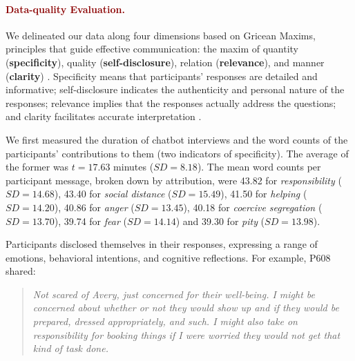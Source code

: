 
\paragraph{\textcolor{darkred}{\textbf{Data-quality Evaluation.}}}
We delineated our data along four dimensions based on Gricean Maxims, principles that guide effective communication: the maxim of quantity (\textbf{specificity}), quality (\textbf{self-disclosure}), relation (\textbf{relevance}), and manner (\textbf{clarity}) \cite{metric_grice_1975, chatbot_xiao_2020}. 
Specificity means that participants' responses are detailed and informative; self-disclosure indicates the authenticity and personal nature of the responses; relevance implies that the responses actually address the questions; and clarity facilitates accurate interpretation \cite{metric_grice_1975}.




We first measured the duration of chatbot interviews and the word counts of the participants' contributions to them (two indicators of specificity). 
The average of the former was $t=17.63$ minutes ($SD = 8.18$). 
The mean word counts per participant message, broken down by attribution, were 43.82 for \textit{responsibility} ($SD = 14.68$), 43.40 for \textit{social distance} ($SD = 15.49$), 41.50 for \textit{helping} ($SD = 14.20$), 40.86 for \textit{anger} ($SD = 13.45$), 40.18 for \textit{coercive segregation} ($SD = 13.70$), 39.74 for \textit{fear} ($SD = 14.14$) and 39.30 for \textit{pity} ($SD = 13.98$).


Participants disclosed themselves in their responses, expressing a range of emotions, behavioral intentions, and cognitive reflections. 
For example, P608 shared:

\begin{quote}
    \textit{Not scared of Avery, just concerned for their well-being. I might be concerned about whether or not they would show up and if they would be prepared, dressed appropriately, and such. I might also take on responsibility for booking things if I were worried they would not get that kind of task done.}
\end{quote}

